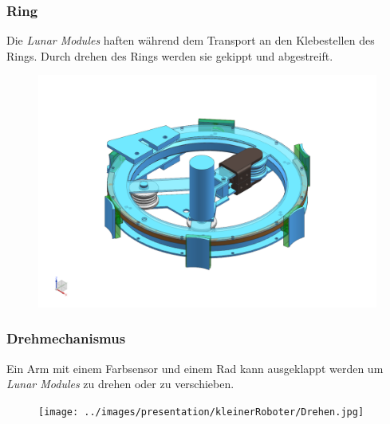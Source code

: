 \begin{frame}
	\frametitle{Ring}
	Die \textit{Lunar Modules} haften während dem Transport an den Klebestellen des Rings.
	Durch drehen des Rings werden sie gekippt und abgestreift.
	\begin{figure}
		\centering
		\includegraphics[height = 4 cm]{../images/presentation/kleinerRoboter/Ring.png}
	\end{figure}
\end{frame}

\begin{frame}
	\frametitle{Drehmechanismus}
	Ein Arm mit einem Farbsensor und einem Rad kann ausgeklappt werden um \textit{Lunar Modules} zu drehen oder zu verschieben.
	\begin{figure}
		\centering
		\texttt{[image: ../images/presentation/kleinerRoboter/Drehen.jpg]}
	\end{figure}
\end{frame}